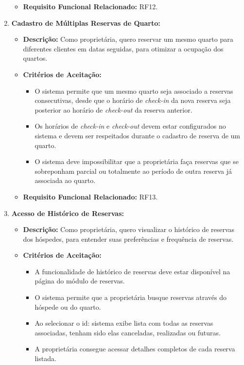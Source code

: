 \documentclass[
	12pt,				%
	openany,			%
	twoside,			%
	a4paper,			%
	english,			%
	french,				%
	spanish,			%
	brazil				%
	]{abntex2}
\begin{document}
\begin{enumerate}[label=\textbf{\arabic*.}]
\begin{itemize}
	 	\item \textbf{Requisito Funcional Relacionado:} RF12.
	 \end{itemize} 
	  \item \textbf{Cadastro de Múltiplas Reservas de Quarto:}
	 \begin{itemize}
	 	\item \textbf{Descrição:} Como proprietária, quero reservar um mesmo quarto para diferentes clientes em datas seguidas, para otimizar a ocupação dos quartos.
	 	\item \textbf{Critérios de Aceitação:}
	 	\begin{itemize}
	 		\item O sistema permite que um mesmo quarto seja associado a reservas consecutivas, desde que o horário de \textit{check-in} da nova reserva seja posterior ao horário de \textit{check-out} da reserva anterior.
	 		\item Os horários de \textit{check-in} e \textit{check-out} devem estar configurados no sistema e devem ser respeitados durante o cadastro de reserva de um quarto.
	 		\item O sistema deve impossibilitar que a proprietária faça reservas que se sobreponham parcial ou totalmente ao período de outra reserva já associada ao quarto.
	 	\end{itemize}
	 	\item \textbf{Requisito Funcional Relacionado:} RF13.
	 \end{itemize} 
	  \item \textbf{Acesso de Histórico de Reservas:}
	 \begin{itemize}
	 	\item \textbf{Descrição:} Como proprietária, quero visualizar o histórico de reservas dos hóspedes, para entender suas preferências e frequência de reservas.
	 	\item \textbf{Critérios de Aceitação:}
	 	\begin{itemize}
	 		\item A funcionalidade de histórico de reservas  deve estar disponível na página do módulo de reservas.
	 		\item O sistema permite que a proprietária busque reservas através do hóspede ou do quarto.
	 		\item Ao selecionar o id: sistema exibe lista com todas as reservas associadas, tenham sido elas canceladas, realizadas ou futuras.
	 		\item A proprietária consegue acessar detalhes completos de cada reserva listada.

\end{itemize}
\end{itemize}
\end{enumerate}
\end{document}
